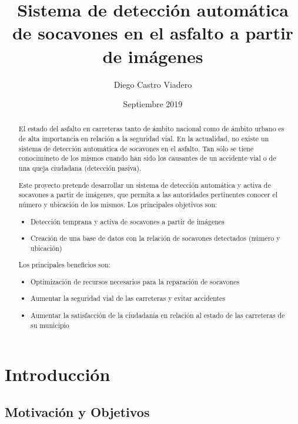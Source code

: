 \documentclass[]{article}
\title{Sistema de detección automática de socavones en el asfalto a partir de imágenes}
\author{Diego Castro Viadero}
\date{Septiembre 2019}
\begin{document}
\maketitle

\begin{abstract}
El estado del asfalto en carreteras tanto de ámbito nacional como de ámbito urbano es de alta importancia en relación a la seguridad vial. En la actualidad, no existe un sistema de detección automática de socavones en el asfalto. Tan sólo se tiene conocimineto de los mismos cuando han sido los causantes de un accidente vial o de una queja ciudadana (detección pasiva).

Este proyecto pretende desarrollar un sistema de detección automática y activa de socavones a partir de imágenes, que permita a las autoridades pertinentes conocer el número y ubicación de los mismos. Los principales objetivos son:

\begin{itemize}
	\item Detección temprana y activa de socavones a partir de imágenes
	\item Creación de una base de datos con la relación de socavones detectados (número y ubicación)
\end{itemize}

Los principales beneficios son:

\begin{itemize}
	\item Optimización de recursos necesarios para la reparación de socavones
	\item Aumentar la seguridad vial de las carreteras y evitar accidentes
	\item Aumentar la satisfacción de la ciudadanía en relación al estado de las carreteras de su municipio
\end{itemize}
\end{abstract}

\newpage
\tableofcontents{}
\newpage

\section{Introducción}


\subsection{Motivación y Objetivos}

\end{document}
